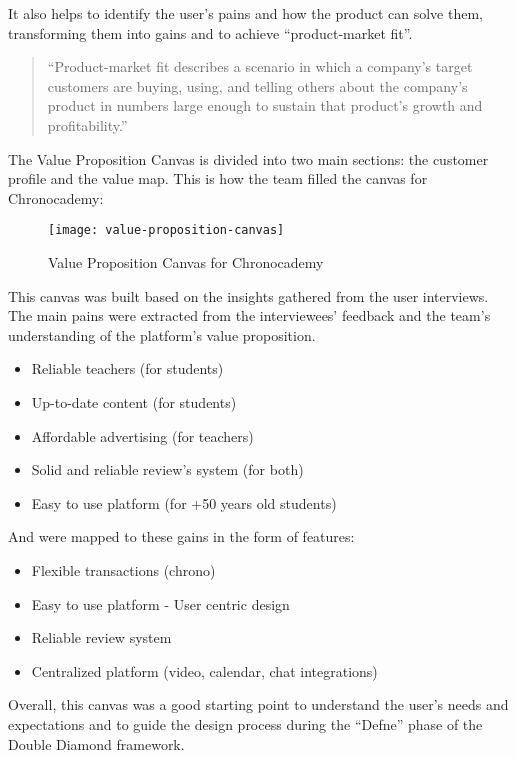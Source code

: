 It also helps to identify the user's pains and how the product can solve them, transforming them into gains and to achieve ``product-market fit''.\newline
\begin{quote}
    ``Product-market fit describes a scenario in which a company’s target
    customers are buying, using, and telling others about the company’s
    product in numbers large enough to sustain that product’s growth and
    profitability.''~\cite[Product Market Fit]{productMarketFit}
\end{quote}

The Value Proposition Canvas is divided into two main sections: the customer profile and the value map.
This is how the team filled the canvas for Chronocademy:

\begin{figure}[h]
    \centering
    \texttt{[image: value-proposition-canvas]}
    \caption{Value Proposition Canvas for Chronocademy}
    \label{fig:figure13}
\end{figure}

This canvas was built based on the insights gathered from the user interviews.
The main pains were extracted from the interviewees' feedback and the team's understanding of the platform's value proposition.
\begin{itemize}
    \item Reliable teachers (for students)
    \item Up-to-date content (for students)
    \item Affordable advertising (for teachers)
    \item Solid and reliable review's system (for both)
    \item Easy to use platform (for +50 years old students)
\end{itemize}
And were mapped to these gains in the form of features:
\begin{itemize}
    \item Flexible transactions (chrono)
    \item Easy to use platform - User centric design
    \item Reliable review system
    \item Centralized platform (video, calendar, chat integrations)
\end{itemize}

Overall, this canvas was a good starting point to understand the user's needs and expectations and to guide the design process during the ``Defne'' phase of the Double Diamond framework.
\clearpage

